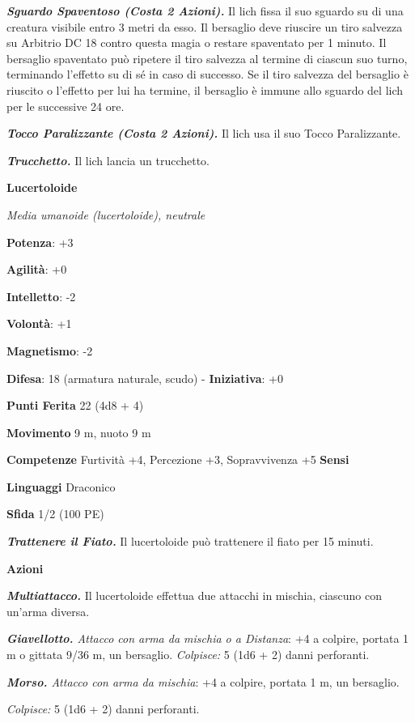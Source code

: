 \begin{multicols}{2}
\emph{\textbf{Sguardo Spaventoso (Costa 2 Azioni).}} Il lich fissa il
suo sguardo su di una creatura visibile entro 3 metri da esso. Il
bersaglio deve riuscire un tiro salvezza su Arbitrio DC 18 contro questa
magia o restare spaventato per 1 minuto. Il bersaglio spaventato può
ripetere il tiro salvezza al termine di ciascun suo turno, terminando
l'effetto su di sé in caso di successo. Se il tiro salvezza del
bersaglio è riuscito o l'effetto per lui ha termine, il bersaglio è
immune allo sguardo del lich per le successive 24 ore.

\emph{\textbf{Tocco Paralizzante (Costa 2 Azioni).}} Il lich usa il suo
Tocco Paralizzante.

\emph{\textbf{Trucchetto.}} Il lich lancia un trucchetto.

\textbf{Lucertoloide}

\emph{Media umanoide (lucertoloide), neutrale}

\textbf{Potenza}: +3

\textbf{Agilità}: +0

\textbf{Intelletto}: -2

\textbf{Volontà}: +1

\textbf{Magnetismo}: -2

\textbf{Difesa}: 18 (armatura naturale, scudo) - \textbf{Iniziativa}: +0

\textbf{Punti Ferita} 22 (4d8 + 4)

\textbf{Movimento} 9 m, nuoto 9 m

\textbf{Competenze} Furtività +4, Percezione +3, Sopravvivenza +5
\textbf{Sensi} 

\textbf{Linguaggi} Draconico

\textbf{Sfida} 1/2 (100 PE)\smallskip

\emph{\textbf{Trattenere il Fiato.}} Il lucertoloide può trattenere il
fiato per 15 minuti.

\smallskip\textbf{Azioni}

\emph{\textbf{Multiattacco.}} Il lucertoloide effettua due attacchi in
mischia, ciascuno con un'arma diversa.

\emph{\textbf{Giavellotto.} Attacco con arma da mischia o a Distanza}:
+4 a colpire, portata 1 m o gittata 9/36 m, un bersaglio.
\emph{Colpisce:} 5 (1d6 + 2) danni perforanti.

\emph{\textbf{Morso.} Attacco con arma da mischia}: +4 a colpire,
portata 1 m, un bersaglio.

\emph{Colpisce:} 5 (1d6 + 2) danni perforanti.


\end{multicols}
